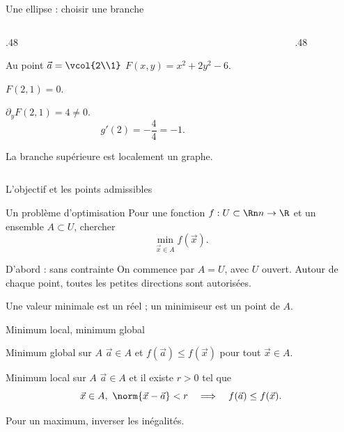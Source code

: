 \begin{frame}[t]{Une ellipse : choisir une branche}
\coursanalyse
\begin{columns}[T,onlytextwidth]\begin{column}{.48\textwidth}
\begin{exemple}{Au point $\vec a=\vcol{2\\1}$}
$F(x,y)=x^2+2y^2-6$.
\par $F(2,1)=0$.
\par $\partial_yF(2,1)=4\ne0$.
\[g'(2)=-\frac44=-1.\]
\end{exemple}
La branche supérieure est localement un graphe.
\end{column}\begin{column}{.48\textwidth}\end{column}\end{columns}
\end{frame}

\begin{frame}[t]{L’objectif et les points admissibles}
\coursanalyse
\begin{notion}{Un problème d’optimisation}
Pour une fonction $f:U\subset\Rn n\to\R$ et un ensemble $A\subset U$, chercher
\[\min_{\vec x\in A}f(\vec x).\]
\end{notion}
\begin{cours}{D’abord : sans contrainte}
On commence par $A=U$, avec $U$ ouvert. Autour de chaque point, toutes les petites directions sont autorisées.
\end{cours}\vfill Une valeur minimale est un réel ; un minimiseur est un point de $A$.
\end{frame}

\begin{frame}[t]{Minimum local, minimum global}
\coursanalyse
\begin{notion}{Minimum global sur $A$}
$\vec a\in A$ et $f(\vec a)\le f(\vec x)$ pour tout $\vec x\in A$.
\end{notion}
\begin{notion}{Minimum local sur $A$}
$\vec a\in A$ et il existe $r>0$ tel que
\[\vec x\in A,\ \norm{\vec x-\vec a}<r\quad\Longrightarrow\quad f(\vec a)\le f(\vec x).\]
\end{notion}\vfill Pour un maximum, inverser les inégalités.
\end{frame}

